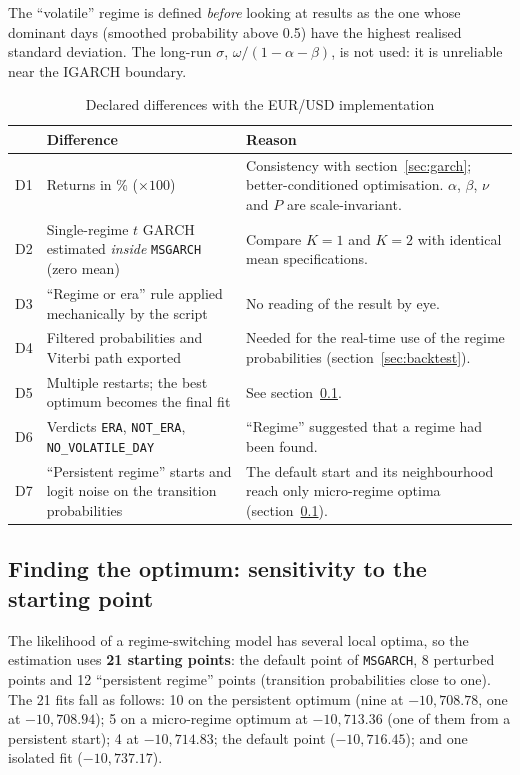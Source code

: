 \documentclass[12pt,a4paper]{article}
\begin{document}
The ``volatile'' regime is defined \emph{before} looking at results as the one whose dominant days (smoothed probability above 0.5) have the highest realised standard deviation. The long-run $\sigma$, $\omega/(1-\alpha-\beta)$, is not used: it is unreliable near the IGARCH boundary.

\begin{table}[H]
	\centering
	\small
	\caption{Declared differences with the EUR/USD implementation}
	\label{tab:ms-diffs}
	\begin{tabular}{cp{4.2cm}p{7cm}}
		\toprule
		& Difference & Reason \\
		\midrule
		D1 & Returns in \% ($\times 100$) & Consistency with section~\ref{sec:garch}; better-conditioned optimisation. $\alpha$, $\beta$, $\nu$ and $P$ are scale-invariant. \\
		D2 & Single-regime $t$ GARCH estimated \emph{inside} \texttt{MSGARCH} (zero mean) & Compare $K=1$ and $K=2$ with identical mean specifications. \\
		D3 & ``Regime or era'' rule applied mechanically by the script & No reading of the result by eye. \\
		D4 & Filtered probabilities and Viterbi path exported & Needed for the real-time use of the regime probabilities (section~\ref{sec:backtest}). \\
		D5 & Multiple restarts; the best optimum becomes the final fit & See section~\ref{sec:ms-optimum}. \\
		D6 & Verdicts \texttt{ERA}, \texttt{NOT\_\allowbreak{}ERA}, \texttt{NO\_\allowbreak{}VOLATILE\_\allowbreak{}DAY} & ``Regime'' suggested that a regime had been found. \\
		D7 & ``Persistent regime'' starts and logit noise on the transition probabilities & The default start and its neighbourhood reach only micro-regime optima (section~\ref{sec:ms-optimum}). \\
		\bottomrule
	\end{tabular}
\end{table}

\subsection{Finding the optimum: sensitivity to the starting point}
\label{sec:ms-optimum}

The likelihood of a regime-switching model has several local optima, so the estimation uses \textbf{21 starting points}: the default point of \texttt{MSGARCH}, 8 perturbed points and 12 ``persistent regime'' points (transition probabilities close to one). The 21 fits fall as follows: 10 on the persistent optimum (nine at $-10{,}708.78$, one at $-10{,}708.94$); 5 on a micro-regime optimum at $-10{,}713.36$ (one of them from a persistent start); 4 at $-10{,}714.83$; the default point ($-10{,}716.45$); and one isolated fit ($-10{,}737.17$).
\end{document}
